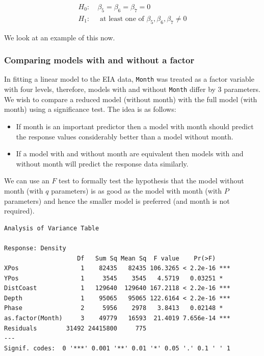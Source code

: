 \documentclass[
  oneside]{krantz}
\providecommand{\tightlist}{%
  \setlength{\itemsep}{0pt}\setlength{\parskip}{0pt}}
\begin{document}
\begin{align*}
H_0:~& \beta_5=\beta_{6}=\beta_{7}=0\\
H_1:~& \textrm{ at least one of } \beta_5,\beta_{6},\beta_{7}  \neq
0
\end{align*}

We look at an example of this now.

\hypertarget{comparing-models-with-and-without-a-factor}{%
\subsubsection{Comparing models with and without a factor}\label{comparing-models-with-and-without-a-factor}}

In fitting a linear model to the EIA data, \texttt{Month} was treated as a factor variable with four levels, therefore, models with and without \texttt{Month} differ by 3 parameters. We wish to compare a reduced model (without month) with the full model (with month) using a significance test. The idea is as follows:

\begin{itemize}
\tightlist
\item
  If month is an important predictor then a model with month should predict the response values considerably better than a model without month.
\item
  If a model with and without month are equivalent then models with and without month will predict the response data similarly.
\end{itemize}

We can use an \(F\) test to formally test the hypothesis that the model without month (with \(q\) parameters) is as good as the model with month (with \(P\) parameters) and hence the smaller model is preferred (and month is not required).\\
\small

\begin{verbatim}
Analysis of Variance Table

Response: Density
                    Df   Sum Sq Mean Sq  F value    Pr(>F)    
XPos                 1    82435   82435 106.3265 < 2.2e-16 ***
YPos                 1     3545    3545   4.5719   0.03251 *  
DistCoast            1   129640  129640 167.2118 < 2.2e-16 ***
Depth                1    95065   95065 122.6164 < 2.2e-16 ***
Phase                2     5956    2978   3.8413   0.02148 *  
as.factor(Month)     3    49779   16593  21.4019 7.656e-14 ***
Residuals        31492 24415800     775                       
---
Signif. codes:  0 '***' 0.001 '**' 0.01 '*' 0.05 '.' 0.1 ' ' 1
\end{verbatim}
\end{document}
